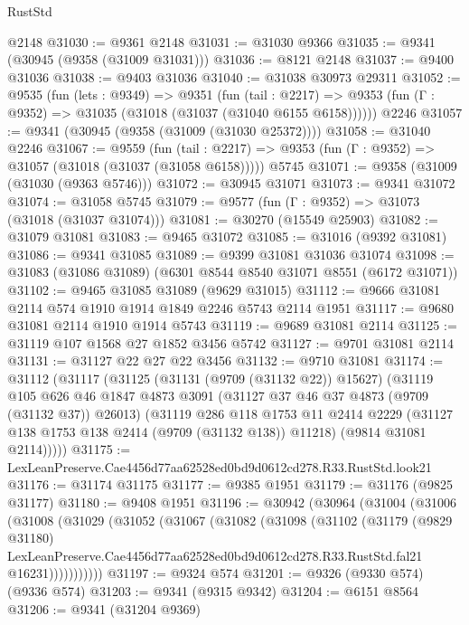 \begin{lexlean}{RustStd}
\begin{coremodule}
    @2148
@31030 := @9361 @2148
@31031 := @31030 @9366
@31035 := @9341 (@30945 (@9358 (@31009 @31031)))
@31036 := @8121 @2148
@31037 := @9400 @31036
@31038 := @9403 @31036
@31040 := @31038 @30973 @29311
@31052 := @9535
    (fun (lets : @9349) =>
    @9351
      (fun (tail : @2217) =>
      @9353 (fun (Γ : @9352) => @31035 (@31018 (@31037 (@31040 @6155 @6158))))))
    @2246
@31057 := @9341 (@30945 (@9358 (@31009 (@31030 @25372))))
@31058 := @31040 @2246
@31067 := @9559
    (fun (tail : @2217) => @9353 (fun (Γ : @9352) => @31057 (@31018 (@31037 (@31058 @6158)))))
    @5745
@31071 := @9358 (@31009 (@31030 (@9363 @5746)))
@31072 := @30945 @31071
@31073 := @9341 @31072
@31074 := @31058 @5745
@31079 := @9577 (fun (Γ : @9352) => @31073 (@31018 (@31037 @31074)))
@31081 := @30270 (@15549 @25903)
@31082 := @31079 @31081
@31083 := @9465 @31072
@31085 := @31016 (@9392 @31081)
@31086 := @9341 @31085
@31089 := @9399 @31081 @31036 @31074
@31098 := @31083 (@31086 @31089) (@6301 @8544 @8540 @31071 @8551 (@6172 @31071))
@31102 := @9465 @31085 @31089 (@9629 @31015)
@31112 := @9666 @31081 @2114 @574 @1910 @1914 @1849 @2246 @5743 @2114 @1951
@31117 := @9680 @31081 @2114 @1910 @1914 @5743
@31119 := @9689 @31081 @2114
@31125 := @31119 @107 @1568 @27 @1852 @3456 @5742
@31127 := @9701 @31081 @2114
@31131 := @31127 @22 @27 @22 @3456
@31132 := @9710 @31081
@31174 := @31112
    (@31117
      (@31125
        (@31131 (@9709 (@31132 @22)) @15627)
        (@31119
          @105
          @626
          @46
          @1847
          @4873
          @3091
          (@31127 @37 @46 @37 @4873 (@9709 (@31132 @37)) @26013)
          (@31119
            @286
            @118
            @1753
            @11
            @2414
            @2229
            (@31127 @138 @1753 @138 @2414 (@9709 (@31132 @138)) @11218)
            (@9814 @31081 @2114)))))
@31175 := LexLeanPreserve.Cae4456d77aa62528ed0bd9d0612cd278.R33.RustStd.look21
@31176 := @31174 @31175
@31177 := @9385 @1951
@31179 := @31176 (@9825 @31177)
@31180 := @9408 @1951
@31196 := @30942
    (@30964
      (@31004
        (@31006
          (@31008
            (@31029
              (@31052
                (@31067
                  (@31082
                    (@31098
                      (@31102
                        (@31179
                          (@9829 @31180)
                          LexLeanPreserve.Cae4456d77aa62528ed0bd9d0612cd278.R33.RustStd.fal21
                          @16231)))))))))))
@31197 := @9324 @574
@31201 := @9326 (@9330 @574) (@9336 @574)
@31203 := @9341 (@9315 @9342)
@31204 := @6151 @8564
@31206 := @9341 (@31204 @9369)

\end{coremodule}
\end{lexlean}
